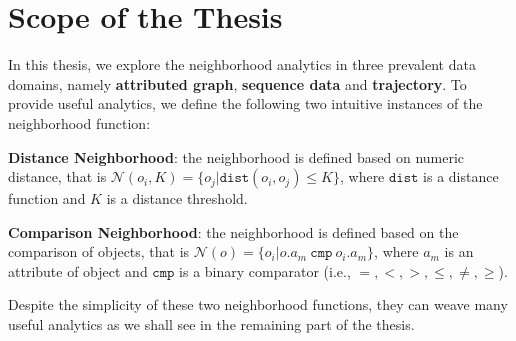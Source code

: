 \section{Scope of the Thesis}
In this thesis, we explore the neighborhood analytics in
three prevalent data domains, namely \textbf{attributed graph},
\textbf{sequence data} and \textbf{trajectory}. 
To provide useful analytics, we define the following
two intuitive instances of the neighborhood function:

\textbf{Distance Neighborhood}: the neighborhood is defined based on numeric distance, that is $\mathcal{N}(o_i,K) = \{o_j | \mathtt{dist}(o_i,o_j) \leq K \}$, where $\mathtt{dist}$ is a distance function and $K$ is a distance threshold.

\textbf{Comparison Neighborhood}: the neighborhood is defined based on the comparison of objects, that is $\mathcal{N}(o) = \{o_i | o.a_m \ \mathtt{cmp} \ o_i.a_m\}$, where $a_m$ is an attribute of object
and $\mathtt{cmp}$ is a binary comparator (i.e., $=,<,>,\leq,\neq,\geq$).

Despite the simplicity of these two neighborhood functions, they can weave many useful analytics as we shall see in the remaining part of the thesis.
%

%
%
%


